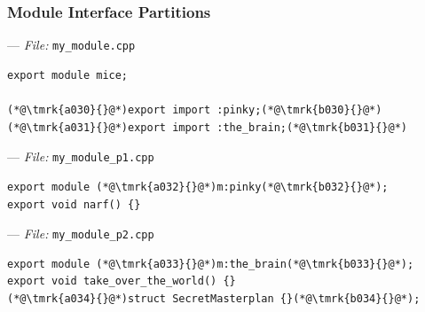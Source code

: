 \documentclass[aspectratio=169]{beamer}
\newif\iftransitions
\newcommand{\cpause}{\iftransitions \pause \fi}
\newcommand{\tmrk}[2]{\tikz[baseline,inner sep=0]\node[anchor=base](#1){#2};}
\begin{document}
\begin{frame}[fragile]
  \frametitle{Module Interface Partitions}

  --- \textit{File:} \texttt{my\_module.cpp}
  \begin{lstlisting}[style=cpp20]
export module mice;

(*@\tmrk{a030}{}@*)export import :pinky;(*@\tmrk{b030}{}@*)
(*@\tmrk{a031}{}@*)export import :the_brain;(*@\tmrk{b031}{}@*)
  \end{lstlisting}

  \cpause
  --- \textit{File:} \texttt{my\_module\_p1.cpp}
  \begin{lstlisting}[style=cpp20]
export module (*@\tmrk{a032}{}@*)m:pinky(*@\tmrk{b032}{}@*);
export void narf() {}
  \end{lstlisting}

  --- \textit{File:} \texttt{my\_module\_p2.cpp}
  \begin{lstlisting}[style=cpp20]
export module (*@\tmrk{a033}{}@*)m:the_brain(*@\tmrk{b033}{}@*);
export void take_over_the_world() {}
(*@\tmrk{a034}{}@*)struct SecretMasterplan {}(*@\tmrk{b034}{}@*);
  \end{lstlisting}

  \iftransitions
  \only<1-2>{\tikz[overlay]\filldraw[blue, opacity=0] ([shift={(0,-0.5ex)}]a030) rectangle ([shift={(0,2ex)}]b030);}
  \only<3>{\tikz[overlay]\filldraw[blue, opacity=0.3] ([shift={(0,-0.5ex)}]a030) rectangle ([shift={(0,2ex)}]b030);}
  \only<3>{\tikz[overlay]\filldraw[blue, opacity=0.3] ([shift={(0,-0.5ex)}]a031) rectangle ([shift={(0,2ex)}]b031);}
  \only<2>{\tikz[overlay]\filldraw[blue, opacity=0.3] ([shift={(0,-0.5ex)}]a032) rectangle ([shift={(0,2ex)}]b032);}
  \only<2>{\tikz[overlay]\filldraw[blue, opacity=0.3] ([shift={(0,-0.5ex)}]a033) rectangle ([shift={(0,2ex)}]b033);}
  \only<4>{\tikz[overlay]\filldraw[blue, opacity=0.3] ([shift={(0,-0.5ex)}]a034) rectangle ([shift={(0,2ex)}]b034);}
  \fi


\end{frame}
\end{document}
